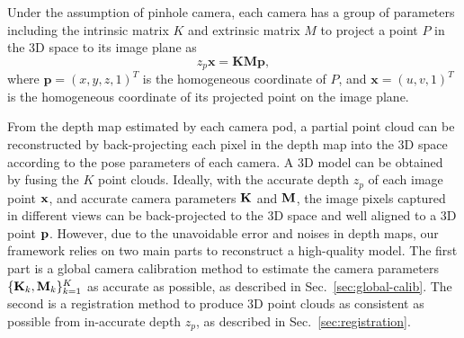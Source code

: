 %
Under the assumption of pinhole camera, each camera has a group of parameters including the intrinsic matrix $K$ and extrinsic matrix $M$ to project a point $P$ in the 3D space to its image plane as
\begin{equation}\label{eq:cam-proj}
z_{p}\mathbf{x}=\mathbf{K}\mathbf{M}\mathbf{p},
\end{equation}
where $\mathbf{p}=(x,y,z,1)^{T}$ is the homogeneous coordinate of $P$, and $\mathbf{x}=(u,v,1)^{T}$ is the homogeneous coordinate of its projected point on the image plane.
%


From the depth map estimated by each camera pod, a partial point cloud can be reconstructed by back-projecting each pixel in the depth map into the 3D space according to the pose parameters of each camera.
%
A 3D model can be obtained by fusing the $K$ point clouds.
%
%
Ideally, with the accurate depth $z_p$ of each image point $\mathbf{x}$, and accurate camera parameters $\mathbf{K}$ and $\mathbf{M}$, the image pixels captured in different views can be back-projected to the 3D space and well aligned to a 3D point $\mathbf{p}$.
%
However, due to the unavoidable error and noises in depth maps, our framework relies on two main parts to reconstruct a high-quality model.
%
The first part is a global camera calibration method to estimate the camera parameters $\{\mathbf{K}_k, \mathbf{M}_k\}^{K}_{k=1}$ as accurate as possible, as described in Sec.~\ref{sec:global-calib}.
The second is a registration method to produce 3D point clouds as consistent as possible from in-accurate depth $z_p$, as described in Sec.~\ref{sec:registration}.



